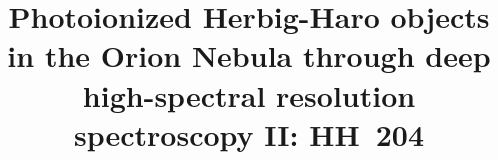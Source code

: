 \documentclass[twocolumn,linenumbers]{aastex63}
\begin{document}
\title{Photoionized Herbig-Haro objects in the Orion Nebula through deep high-spectral resolution spectroscopy II: HH~204}



\end{document}
